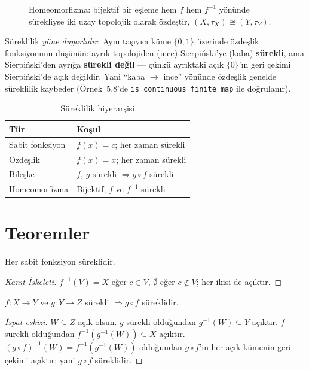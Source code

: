\begin{figure}[ht]
  \centering
  
  \caption{Homeomorfizma: bijektif bir eşleme hem $f$ hem $f^{-1}$ yönünde
    sürekliyse iki uzay topolojik olarak özdeştir, $(X,\tau_X)\cong(Y,\tau_Y)$.}
  \label{fig:ch10:homeo}
\end{figure}

\begin{karsiornek}
Süreklilik \emph{yöne duyarlıdır}. Aynı taşıyıcı küme $\{0,1\}$ üzerinde
özdeşlik fonksiyonunu düşünün: ayrık topolojiden (ince) Sierpiński'ye (kaba)
\textbf{sürekli}, ama Sierpiński'den ayrığa \textbf{sürekli değil} --- çünkü
ayrıktaki açık $\{0\}$'ın geri çekimi Sierpiński'de açık değildir. Yani
``kaba $\to$ ince'' yönünde özdeşlik genelde süreklilik kaybeder
(Örnek~5.8'de \texttt{is\_continuous\_finite\_map} ile doğrulanır).
\end{karsiornek}

\begin{table}[h]
\centering
\begin{tabular}{ll}
\toprule
\textbf{Tür} & \textbf{Koşul} \\
\midrule
Sabit fonksiyon & $f(x) = c$; her zaman sürekli \\
Özdeşlik & $f(x) = x$; her zaman sürekli \\
Bileşke & $f$, $g$ sürekli $\Rightarrow g \circ f$ sürekli \\
Homeomorfizma & Bijektif; $f$ ve $f^{-1}$ sürekli \\
\bottomrule
\end{tabular}
\caption{Süreklilik hiyerarşisi}
\end{table}

\section{Teoremler}

\begin{theorem}
Her sabit fonksiyon süreklidir.
\begin{proof}[Kanıt İskeleti]
$f^{-1}(V) = X$ eğer $c \in V$, $\emptyset$ eğer $c \notin V$; her ikisi de açıktır.
\end{proof}
\end{theorem}

\begin{theorem}
$f: X \to Y$ ve $g: Y \to Z$ sürekli $\Rightarrow g \circ f$ süreklidir.
\begin{proof}[İspat eskizi]
$W \subseteq Z$ açık olsun. $g$ sürekli olduğundan $g^{-1}(W) \subseteq Y$
açıktır. $f$ sürekli olduğundan $f^{-1}(g^{-1}(W)) \subseteq X$ açıktır.
$(g\circ f)^{-1}(W) = f^{-1}(g^{-1}(W))$ olduğundan $g\circ f$'in her açık
kümenin geri çekimi açıktır; yani $g\circ f$ süreklidir.
\end{proof}
\end{theorem}

